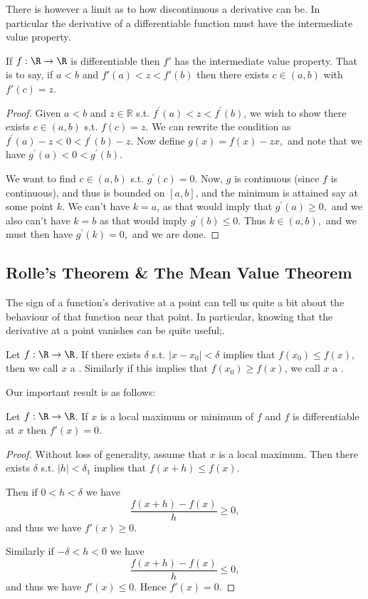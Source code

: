 There is however a limit as to how discontinuous a derivative can be. In particular the derivative of a differentiable function must have the intermediate value property.

\begin{theorem}
	If $f: \R \rightarrow \R$ is differentiable then $f'$ has the intermediate value property. That is to say, if $a < b$ and $f'(a) < z < f'(b)$ then there exists $c \in (a, b)$ with $f'(c) = z$.
\end{theorem}
\begin{proof}
Given $a<b$ and $z \in \mathbb{R}$ s.t. $f^{\prime}(a)<z<f^{\prime}(b)$, we wish to show there exists $c \in(a, b)$ s.t. $f(c)=z$. We can rewrite the condition as $f^{\prime}(a)-z<0<f^{\prime}(b)-z$. Now define $g(x)=f(x)-z x,$ and note that we have $g^{\prime}(a)<0<g^{\prime}(b)$.

We want to find $c \in(a, b)$ s.t. $g^{\prime}(c)=0$. Now, $g$ is continuous (since $f$ is continuous), and thus is bounded on $[a, b]$, and the minimum is attained say at some point $k$. We can't have $k=a$, as that would imply that $g^{\prime}(a) \geq 0,$ and we also can't have $k=b$ as that would imply $g^{\prime}(b) \leq 0$. Thus $k \in(a, b),$ and we must then have $g^{\prime}(k)=0,$ and we are done.
\end{proof}

\subsection{Rolle's Theorem \& The Mean Value Theorem}

The sign of a function's derivative at a point can tell us quite a bit about the behaviour of that function near that point.
In particular, knowing that the derivative at a point vanishes can be quite useful;.

\begin{definition}
	Let $f: \R \rightarrow \R$. If there exists $\delta$ s.t. $|x - x_0| < \delta$ implies that $f(x_0) \leq f(x)$, then we call $x$ a . 
	Similarly if this implies that $f(x_0) \geq f(x)$, we call $x$ a . 
\end{definition}

Our important result is as follows:

\begin{lemma}\label{lemma:maxima}
	Let $f: \R \rightarrow \R$. If $x$ is a local maximum or minimum of $f$ and $f$ is differentiable at $x$ then $f'(x) = 0$.
\end{lemma}
\begin{proof}
	Without loss of generality, assume that $x$ is a local maximum. Then there exists $\delta$ s.t. $|h| < \delta_1$ implies that $f(x + h) \leq f(x)$. 
	
	Then if $0 < h < \delta$ we have
	$$
		\frac{f(x + h) - f(x)}{h} \geq 0,
	$$
	and thus we have $f'(x) \geq 0$.

	Similarly if $- \delta < h < 0$ we have
	$$
	\frac{f(x + h) - f(x)}{h} \leq 0,
	$$
	and thus we have $f'(x) \leq 0$. Hence $f'(x) = 0$.
\end{proof}

